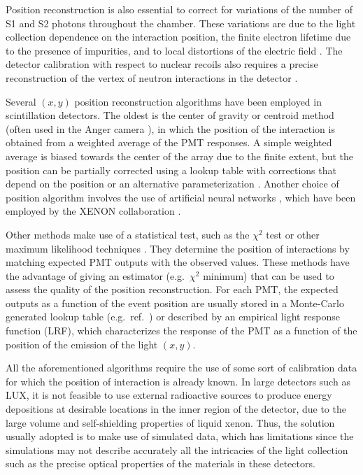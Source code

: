 \documentclass[a4paper,11pt]{article}
\begin{document}
Position reconstruction is also essential to correct for variations of the number of S1 and S2 photons throughout the chamber. These variations  are due to the light collection dependence on the interaction position, the finite electron lifetime due to the presence of impurities, and to local distortions of the electric field \cite{Fields2017}. The detector calibration with respect to nuclear recoils also requires a precise reconstruction of the vertex of neutron interactions in the detector \cite{LUX2016_DDCalibrations}.

Several $(x, y)$ position reconstruction algorithms have been employed in scintillation detectors. The oldest is the center of gravity or centroid method (often used in the Anger camera \cite{Anger1958_ScintillationCamera}), in which the position of the interaction is obtained from a weighted average of the PMT responses. A simple weighted average is biased towards the center of the array due to the finite extent, but the position can be partially corrected using a lookup table with corrections that depend on the position or an alternative parameterization \cite{Short_1984}. Another choice of position algorithm involves the use of artificial neural networks \cite{Morozov2016}, which have been employed by the XENON collaboration \cite{Pelssers_2015MT}.

Other  methods make use of a statistical test, such as the $\chi^2$ test or other maximum likelihood techniques \cite{Gray1976}. They determine the position of interactions by matching expected PMT outputs with the observed values. These methods have the advantage of giving an estimator (e.g.\ $\chi^2$ minimum) that can be used to assess the quality of the position reconstruction. For each PMT, the expected outputs as a function of the event position are usually stored in a Monte-Carlo generated lookup table (e.g.\ ref.\ \cite{Lindote2007}) or described by an empirical light response function (LRF), which characterizes the response of the PMT as a function of the position of the emission of the light $(x, y)$.

All the aforementioned algorithms require the use of some sort of calibration data for which the position of interaction is already known. In large detectors such as LUX, it is not feasible to use external radioactive sources to produce energy depositions at desirable locations in the inner region of the detector, due to the large volume and self-shielding properties of liquid xenon. Thus, the solution usually adopted is to make use of simulated data, which has limitations since the simulations may not describe accurately all the intricacies of the light collection such as the precise optical properties of the materials in these detectors. 
\end{document}
